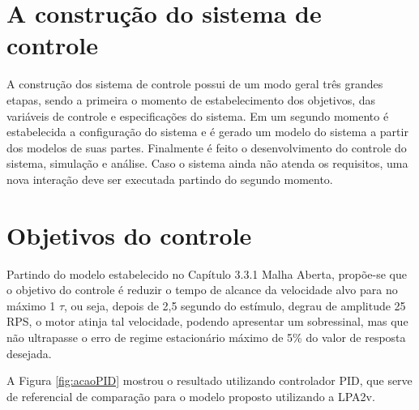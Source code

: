 
\section{ A construção do sistema de controle }	

A construção dos sistema de controle possui de um modo geral três grandes etapas, sendo a primeira o momento de estabelecimento dos objetivos, das variáveis de controle e especificações do sistema. Em um segundo momento é estabelecida a configuração do sistema e é gerado um modelo do sistema a partir dos modelos de suas partes. Finalmente é feito o desenvolvimento do controle do sistema, simulação e análise. Caso o sistema ainda não atenda os requisitos, uma nova interação deve ser executada partindo do segundo momento.


\section{ Objetivos do controle }

Partindo do modelo estabelecido no Capítulo 3.3.1 Malha Aberta,  
propõe-se que o objetivo do controle é 
reduzir o tempo de alcance da velocidade alvo para no máximo 1 $\tau$, 
ou seja, depois de 2,5 segundo do estímulo, 
degrau de amplitude 25 RPS, 
o motor atinja tal velocidade, 
podendo apresentar um sobressinal, mas que não ultrapasse o   
erro de regime estacionário máximo de 5\% do valor de resposta desejada. 

A Figura \ref{fig:acaoPID} mostrou o resultado utilizando controlador PID, 
que serve de referencial de comparação para o modelo proposto utilizando 
a LPA2v. 










